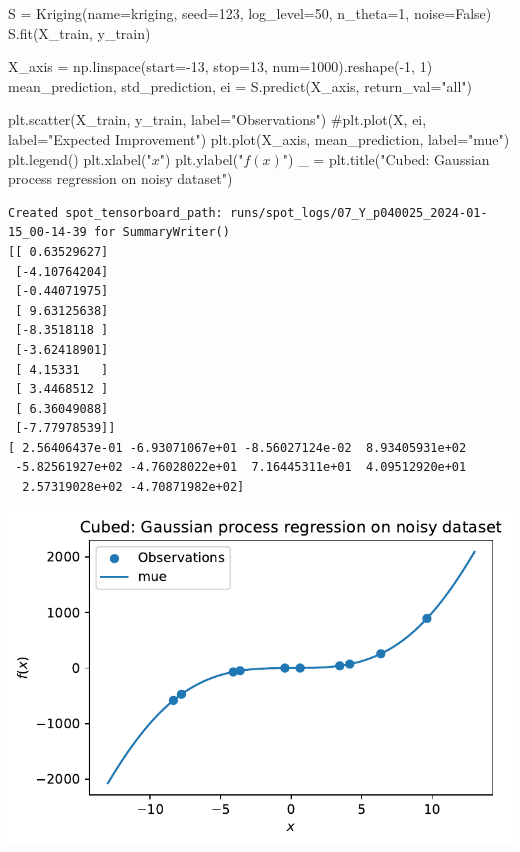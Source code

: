 \documentclass[
  letterpaper,
  DIV=11,
  numbers=noendperiod]{scrreprt}
\newenvironment{Shaded}{\begin{snugshade}}{\end{snugshade}}
\newcommand{\CommentTok}[1]{\textcolor[rgb]{0.37,0.37,0.37}{#1}}
\newcommand{\DecValTok}[1]{\textcolor[rgb]{0.68,0.00,0.00}{#1}}
\newcommand{\NormalTok}[1]{\textcolor[rgb]{0.00,0.23,0.31}{#1}}
\newcommand{\OperatorTok}[1]{\textcolor[rgb]{0.37,0.37,0.37}{#1}}
\newcommand{\StringTok}[1]{\textcolor[rgb]{0.13,0.47,0.30}{#1}}
\newcommand{\VariableTok}[1]{\textcolor[rgb]{0.07,0.07,0.07}{#1}}
\begin{document}
\begin{Shaded}
\begin{Highlighting}[]
\NormalTok{S }\OperatorTok{=}\NormalTok{ Kriging(name}\OperatorTok{=}\StringTok{\textquotesingle{}kriging\textquotesingle{}}\NormalTok{,  seed}\OperatorTok{=}\DecValTok{123}\NormalTok{, log\_level}\OperatorTok{=}\DecValTok{50}\NormalTok{, n\_theta}\OperatorTok{=}\DecValTok{1}\NormalTok{, noise}\OperatorTok{=}\VariableTok{False}\NormalTok{)}
\NormalTok{S.fit(X\_train, y\_train)}

\NormalTok{X\_axis }\OperatorTok{=}\NormalTok{ np.linspace(start}\OperatorTok{={-}}\DecValTok{13}\NormalTok{, stop}\OperatorTok{=}\DecValTok{13}\NormalTok{, num}\OperatorTok{=}\DecValTok{1000}\NormalTok{).reshape(}\OperatorTok{{-}}\DecValTok{1}\NormalTok{, }\DecValTok{1}\NormalTok{)}
\NormalTok{mean\_prediction, std\_prediction, ei }\OperatorTok{=}\NormalTok{ S.predict(X\_axis, return\_val}\OperatorTok{=}\StringTok{"all"}\NormalTok{)}

\NormalTok{plt.scatter(X\_train, y\_train, label}\OperatorTok{=}\StringTok{"Observations"}\NormalTok{)}
\CommentTok{\#plt.plot(X, ei, label="Expected Improvement")}
\NormalTok{plt.plot(X\_axis, mean\_prediction, label}\OperatorTok{=}\StringTok{"mue"}\NormalTok{)}
\NormalTok{plt.legend()}
\NormalTok{plt.xlabel(}\StringTok{"$x$"}\NormalTok{)}
\NormalTok{plt.ylabel(}\StringTok{"$f(x)$"}\NormalTok{)}
\NormalTok{\_ }\OperatorTok{=}\NormalTok{ plt.title(}\StringTok{"Cubed: Gaussian process regression on noisy dataset"}\NormalTok{)}
\end{Highlighting}
\end{Shaded}

\begin{verbatim}
Created spot_tensorboard_path: runs/spot_logs/07_Y_p040025_2024-01-15_00-14-39 for SummaryWriter()
[[ 0.63529627]
 [-4.10764204]
 [-0.44071975]
 [ 9.63125638]
 [-8.3518118 ]
 [-3.62418901]
 [ 4.15331   ]
 [ 3.4468512 ]
 [ 6.36049088]
 [-7.77978539]]
[ 2.56406437e-01 -6.93071067e+01 -8.56027124e-02  8.93405931e+02
 -5.82561927e+02 -4.76028022e+01  7.16445311e+01  4.09512920e+01
  2.57319028e+02 -4.70871982e+02]
\end{verbatim}

\includegraphics{012_num_spot_ei_files/figure-pdf/cell-53-output-2.pdf}
\end{document}
